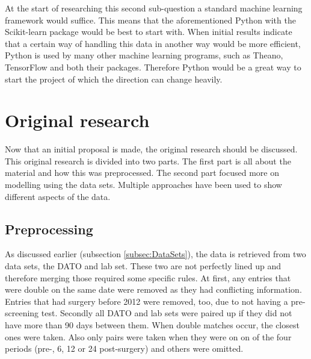 \documentclass[10pt,a4paper]{article}
\begin{document}
	At the start of researching this second sub-question a standard machine learning framework would suffice. This means that the aforementioned Python with the Scikit-learn package would be best to start with. When initial results indicate that a certain way of handling this data in another way would be more efficient, Python is used by many other machine learning programs, such as Theano, TensorFlow and both their packages. Therefore Python would be a great way to start the project of which the direction can change heavily.
	
	\clearpage
	
	\section{Original research}
	
	Now that an initial proposal is made, the original research should be discussed. This original research is divided into two parts. The first part is all about the material and how this was preprocessed. The second part focused more on modelling using the data sets. Multiple approaches have been used to show different aspects of the data.
	
	\subsection{Preprocessing}
	\label{subsec:Preprocessing}
	
	As discussed earlier (subsection \ref{subsec:DataSets}), the data is retrieved from two data sets, the DATO and lab set. These two are not perfectly lined up and therefore merging those required some specific rules. At first, any entries that were double on the same date were removed as they had conflicting information. Entries that had surgery before 2012 were removed, too, due to not having a pre-screening test. Secondly all DATO and lab sets were paired up if they did not have more than 90 days between them. When double matches occur, the closest ones were taken. Also only pairs were taken when they were on on of the four periods (pre-, 6, 12 or 24 post-surgery) and others were omitted.
	
\end{document}
